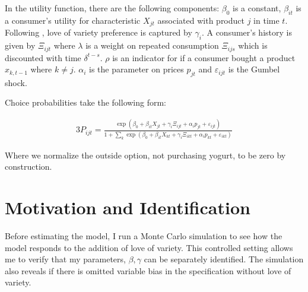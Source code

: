 \documentclass[11pt]{article}
\theoremstyle{definition}
\theoremstyle{remark}
\begin{document}
    In the utility function, there are the following components: $\beta_0$ is a constant, $\beta_{it}$ is a consumer's utility for characteristic $X_{jt}$ associated with product $j$ in time $t$. Following \citet{lattin_model_1987}, love of variety preference is captured by $\gamma_i$. A consumer's history is given by $\Xi_{ijt}$ where $\lambda$ is a weight on repeated consumption $\Xi_{ijs}$ which is discounted with time $\delta^{t-s}$. $\rho$ is an indicator for if a consumer bought a product $x_{k,t-1}$ where $k\ne j$. $\alpha_i$ is the parameter on prices $p_{jt}$ and $\varepsilon_{ijt}$ is the Gumbel shock.

    Choice probabilities take the following form:

    \begin{alignat*}{3}
      P_{ijt} = \frac{\exp(\beta_0 + \beta_{it}X_{jt} + \gamma_i\Xi_{ijt} + \alpha_ip_{jt} +  \varepsilon_{ijt})}{1 + \sum_k\exp(\beta_0+\beta_{it}X_{kt} + \gamma_i\Xi_{ikt} + \alpha_ip_{kt} + \varepsilon_{ikt})}
    \end{alignat*}

    Where we normalize the outside option, not purchasing yogurt, to be zero by construction. 

\section{Motivation and Identification}

Before estimating the model, I run a Monte Carlo simulation to see how the model responds to the addition of love of variety. This controlled setting allows me to verify that my parameters, $\beta, \gamma$ can be separately identified. The simulation also reveals if there is omitted variable bias in the specification without love of variety.
\end{document}
